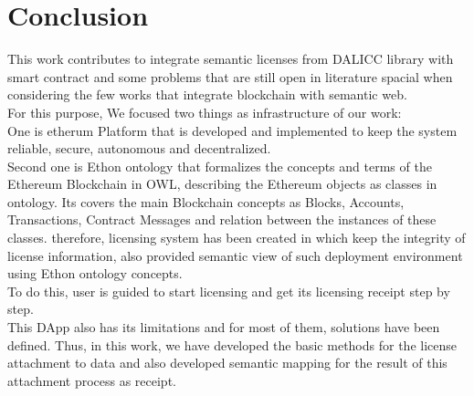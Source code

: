 \chapter{Conclusion}
This work contributes to  integrate semantic licenses from DALICC library with smart contract and some problems that are still open in literature spacial when considering the few works that integrate blockchain with semantic web.\\
 For this purpose, We focused two things as infrastructure of our work:\\
 One is etherum Platform that is developed and implemented to keep the system reliable, secure, autonomous and decentralized.\\
 Second one is Ethon ontology that formalizes the concepts and terms of the Ethereum Blockchain in OWL, describing the Ethereum objects as
classes in ontology. Its covers the main Blockchain concepts as Blocks, Accounts, Transactions, Contract Messages and relation between the instances of these classes.
therefore, licensing system has been created in which keep the integrity of license information, also provided semantic view of such deployment environment using Ethon ontology concepts.\\
To do this, user is guided to start licensing and get its licensing receipt step by step. \\
This DApp also has its limitations and for most of them, solutions have been defined. Thus, in this work, we have developed the basic methods for the license attachment to data and also developed semantic mapping for the result of this attachment process as receipt.

